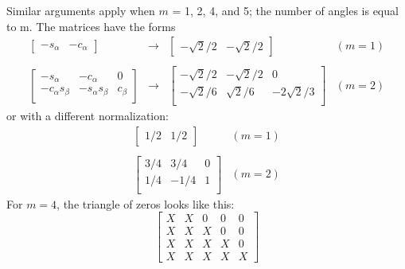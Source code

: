 Similar arguments apply when $m$ = 1, 2, 4, and 5; the number of angles is
equal to m.  The matrices have the forms
\begin{equation*}
\begin{array}{rclc}

\left[
\begin{array}{cc}
-s_\alpha & -c_\alpha
\end{array}
\right]
&
\rightarrow
&
\left[
\begin{array}{cc}
-\sqrt{2}/2 & -\sqrt{2}/2
\end{array}
\right]
& (m = 1) \\

& & & \\

\left[
\begin{array}{ccc}
-s_\alpha         & -c_\alpha         & 0       \\
-c_\alpha s_\beta & -s_\alpha s_\beta & c_\beta \\
\end{array}
\right]
&
\rightarrow
&
\left[
\begin{array}{rrc}
-\sqrt{2}/2 & -\sqrt{2}/2 &  0            \\
-\sqrt{2}/6 &  \sqrt{2}/6 & -2 \sqrt{2}/3 \\
\end{array}
\right]
& (m = 2)

\end{array}
\end{equation*}
or with a different normalization:
\begin{equation*}
\begin{array}{ll}

\left[
\begin{array}{rr}
1/2 & 1/2
\end{array}
\right]
& (m=1) \\

& \\

\left[
\begin{array}{rrr}
3/4 &  3/4 & 0 \\
1/4 & -1/4 & 1 \\
\end{array}
\right]
& (m=2)

\end{array}
\end{equation*}
For $m = 4$, the triangle of zeros looks like this:
\begin{equation*}
\begin{bmatrix}
X & X & 0 & 0 & 0 \\
X & X & X & 0 & 0 \\
X & X & X & X & 0 \\
X & X & X & X & X
\end{bmatrix}
\end{equation*}
